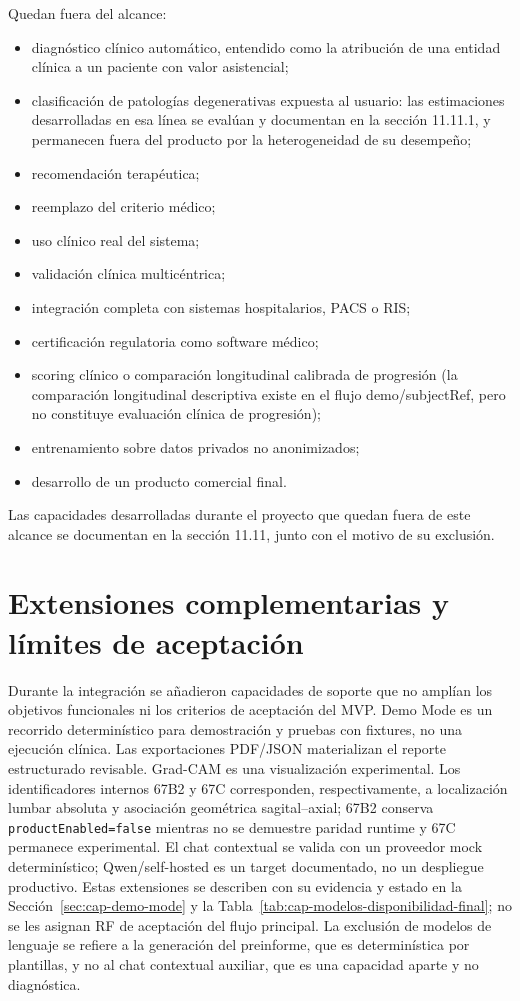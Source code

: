 Quedan fuera del alcance:

\begin{itemize}
  \item diagnóstico clínico automático, entendido como la atribución de una entidad clínica a un paciente con valor asistencial;
  \item clasificación de patologías degenerativas expuesta al usuario: las estimaciones desarrolladas en esa línea se evalúan y documentan en la sección 11.11.1, y permanecen fuera del producto por la heterogeneidad de su desempeño;
  \item recomendación terapéutica;
  \item reemplazo del criterio médico;
  \item uso clínico real del sistema;
  \item validación clínica multicéntrica;
  \item integración completa con sistemas hospitalarios, PACS o RIS;
  \item certificación regulatoria como software médico;
  \item scoring clínico o comparación longitudinal calibrada de progresión (la comparación longitudinal descriptiva existe en el flujo demo/subjectRef, pero no constituye evaluación clínica de progresión);
  \item entrenamiento sobre datos privados no anonimizados;
  \item desarrollo de un producto comercial final.
\end{itemize}

Las capacidades desarrolladas durante el proyecto que quedan fuera de este alcance se documentan en la sección 11.11, junto con el motivo de su exclusión.

\section{Extensiones complementarias y límites de aceptación}

Durante la integración se añadieron capacidades de soporte que no amplían los objetivos funcionales ni los criterios de aceptación del MVP. Demo Mode es un recorrido determinístico para demostración y pruebas con fixtures, no una ejecución clínica. Las exportaciones PDF/JSON materializan el reporte estructurado revisable. Grad-CAM es una visualización experimental. Los identificadores internos 67B2 y 67C corresponden, respectivamente, a localización lumbar absoluta y asociación geométrica sagital--axial; 67B2 conserva \texttt{productEnabled=false} mientras no se demuestre paridad runtime y 67C permanece experimental. El chat contextual se valida con un proveedor mock determinístico; Qwen/self-hosted es un target documentado, no un despliegue productivo. Estas extensiones se describen con su evidencia y estado en la Sección~\ref{sec:cap-demo-mode} y la Tabla~\ref{tab:cap-modelos-disponibilidad-final}; no se les asignan RF de aceptación del flujo principal. La exclusión de modelos de lenguaje se refiere a la generación del preinforme, que es determinística por plantillas, y no al chat contextual auxiliar, que es una capacidad aparte y no diagnóstica.

